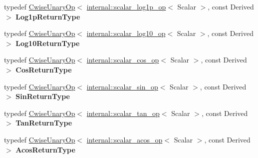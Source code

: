 \begin{DoxyCompactItemize}
\item 
\mbox{\label{class_eigen_1_1_array_base_ae288968798661f74b36fe7a3c4341ef4}} 
typedef \mbox{\hyperlink{class_eigen_1_1_cwise_unary_op}{Cwise\+Unary\+Op}}$<$ \mbox{\hyperlink{struct_eigen_1_1internal_1_1scalar__log1p__op}{internal\+::scalar\+\_\+log1p\+\_\+op}}$<$ Scalar $>$, const Derived $>$ {\bfseries Log1p\+Return\+Type}
\item 
\mbox{\label{class_eigen_1_1_array_base_a73479f077ceabdbb56370f7c1bf1de1a}} 
typedef \mbox{\hyperlink{class_eigen_1_1_cwise_unary_op}{Cwise\+Unary\+Op}}$<$ \mbox{\hyperlink{struct_eigen_1_1internal_1_1scalar__log10__op}{internal\+::scalar\+\_\+log10\+\_\+op}}$<$ Scalar $>$, const Derived $>$ {\bfseries Log10\+Return\+Type}
\item 
\mbox{\label{class_eigen_1_1_array_base_a34a5cd1127cd2b78affa6f058b34644e}} 
typedef \mbox{\hyperlink{class_eigen_1_1_cwise_unary_op}{Cwise\+Unary\+Op}}$<$ \mbox{\hyperlink{struct_eigen_1_1internal_1_1scalar__cos__op}{internal\+::scalar\+\_\+cos\+\_\+op}}$<$ Scalar $>$, const Derived $>$ {\bfseries Cos\+Return\+Type}
\item 
\mbox{\label{class_eigen_1_1_array_base_ab5b2cb1490a7be2c1a80835b805ec185}} 
typedef \mbox{\hyperlink{class_eigen_1_1_cwise_unary_op}{Cwise\+Unary\+Op}}$<$ \mbox{\hyperlink{struct_eigen_1_1internal_1_1scalar__sin__op}{internal\+::scalar\+\_\+sin\+\_\+op}}$<$ Scalar $>$, const Derived $>$ {\bfseries Sin\+Return\+Type}
\item 
\mbox{\label{class_eigen_1_1_array_base_a52db495d7c4673462dd75e6903d89bd6}} 
typedef \mbox{\hyperlink{class_eigen_1_1_cwise_unary_op}{Cwise\+Unary\+Op}}$<$ \mbox{\hyperlink{struct_eigen_1_1internal_1_1scalar__tan__op}{internal\+::scalar\+\_\+tan\+\_\+op}}$<$ Scalar $>$, const Derived $>$ {\bfseries Tan\+Return\+Type}
\item 
\mbox{\label{class_eigen_1_1_array_base_a43c0894ca3f70c547626793a60edfb6c}} 
typedef \mbox{\hyperlink{class_eigen_1_1_cwise_unary_op}{Cwise\+Unary\+Op}}$<$ \mbox{\hyperlink{struct_eigen_1_1internal_1_1scalar__acos__op}{internal\+::scalar\+\_\+acos\+\_\+op}}$<$ Scalar $>$, const Derived $>$ {\bfseries Acos\+Return\+Type}

\end{DoxyCompactItemize}
